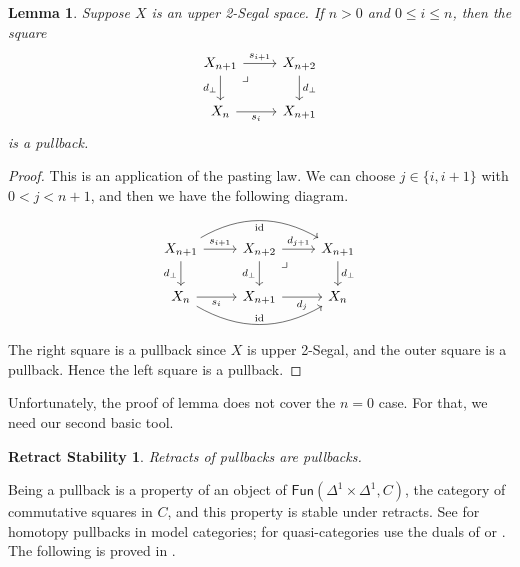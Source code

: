 \documentclass{amsart}
\newtheorem{lemma}[theorem]{Lemma}
\newtheorem*{retrstab}{Retract Stability}
\theoremstyle{definition}
\theoremstyle{remark}
\newcommand{\fun}{\mathsf{Fun}}
\newcommand{\op}{\textup{op}}
\DeclareMathOperator{\id}{id}
\begin{document}


\begin{lemma}\label{lem higher degen}
Suppose $X$ is an upper %
2-Segal space.
If $n > 0$ and $0\leq i \leq n$, then the square
\[ \begin{tikzcd}
X_{n+1} \rar{s_{i+1}} \dar[swap]{d_\bot} \ar[dr, phantom, "\lrcorner" very near start]  & X_{n+2} \dar{d_\bot} \\
X_n  \rar[swap]{s_i} & X_{n+1}
\end{tikzcd} %
\]
is a pullback.
\end{lemma}
\begin{proof}
This is an application of the pasting law.
We can choose $j \in \{i,i+1 \}$ with $0 < j < n+1$, and then we have the following diagram.
\[
\begin{tikzcd}
X_{n+1} \ar[rr,bend left, "\id"'] \rar{s_{i+1}} \dar[swap]{d_\bot} & X_{n+2} \dar[swap]{d_\bot} \ar[dr, phantom, "\lrcorner" very near start] \rar{d_{j+1}} & X_{n+1} \dar{d_\bot} \\
X_n  \rar[swap]{s_i} \ar[rr, bend right, "\id"] & X_{n+1} \rar[swap]{d_j} & X_n
\end{tikzcd}
\]
The right square is a pullback since $X$ is upper 2-Segal, and the outer square is a pullback.
Hence the left square is a pullback.
\end{proof}

Unfortunately, the proof of lemma does not cover the $n=0$ case.
For that, we need our second basic tool.

\begin{retrstab}
Retracts of pullbacks are pullbacks.
\end{retrstab}
Being a pullback is a property of an object of $\fun(\Delta^1 \times \Delta^1, C)$, the category of commutative squares in $C$, and this property is stable under retracts.
See \cite[Appendix A]{Feller_et_al:E2SSU} for homotopy pullbacks in model categories; for quasi-categories use the duals of \cite[Lemma 5.1.6.3]{Lurie:HTT} or \cite[\href{https://kerodon.net/tag/05E6}{Tag 05E6}]{kerodon}.
The following is proved in \cite{Feller_et_al:E2SSU}.
\end{document}
